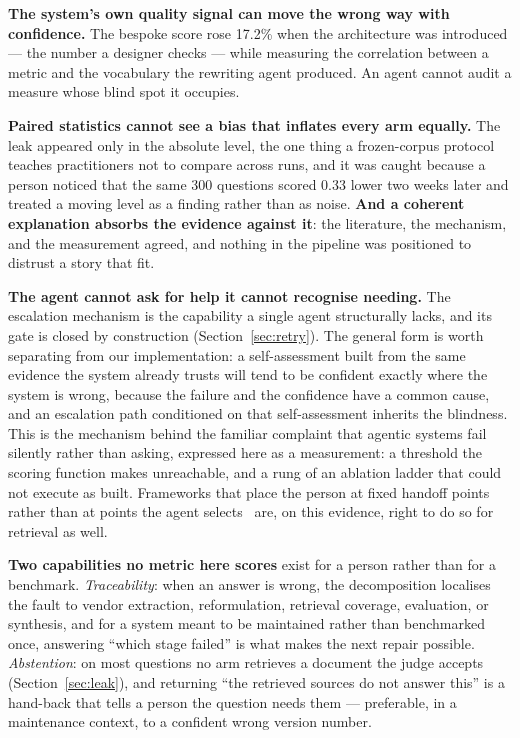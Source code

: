 \documentclass[10pt,conference]{IEEEtran}
\begin{document}
\textbf{The system's own quality signal can move the wrong way with
confidence.} The bespoke score rose 17.2\% when the architecture was introduced
--- the number a designer checks --- while measuring the correlation between a
metric and the vocabulary the rewriting agent produced. An agent cannot audit a
measure whose blind spot it occupies.

\textbf{Paired statistics cannot see a bias that inflates every arm equally.} The
leak appeared only in the absolute level, the one thing a frozen-corpus protocol
teaches practitioners not to compare across runs, and it was caught because a
person noticed that the same 300 questions scored 0.33 lower two weeks later and
treated a moving level as a finding rather than as noise. \textbf{And a coherent
explanation absorbs the evidence against it}: the literature, the mechanism, and
the measurement agreed, and nothing in the pipeline was positioned to distrust a
story that fit.

\textbf{The agent cannot ask for help it cannot recognise needing.} The
escalation mechanism is the capability a single agent structurally lacks, and its
gate is closed by construction (Section~\ref{sec:retry}). The general form is
worth separating from our implementation: a self-assessment built from the same
evidence the system already trusts will tend to be confident exactly where the
system is wrong, because the failure and the confidence have a common cause, and
an escalation path conditioned on that self-assessment inherits the blindness.
This is the mechanism behind the familiar complaint that agentic systems fail
silently rather than asking, expressed here as a measurement: a threshold the
scoring function makes unreachable, and a rung of an ablation ladder that could
not execute as built. Frameworks that place the person at fixed handoff points
rather than at points the agent selects~\cite{takerngsaksiri2025hula} are, on
this evidence, right to do so for retrieval as well.

\textbf{Two capabilities no metric here scores} exist for a person rather than
for a benchmark. \emph{Traceability}: when an answer is wrong, the decomposition
localises the fault to vendor extraction, reformulation, retrieval coverage,
evaluation, or synthesis, and for a system meant to be maintained rather than
benchmarked once, answering ``which stage failed'' is what makes the next repair
possible. \emph{Abstention}: on most questions no arm retrieves a document the judge accepts
(Section~\ref{sec:leak}), and returning ``the retrieved sources do not answer
this'' is a hand-back that tells a person the question needs them --- preferable,
in a maintenance context, to a confident wrong version number.
\end{document}
